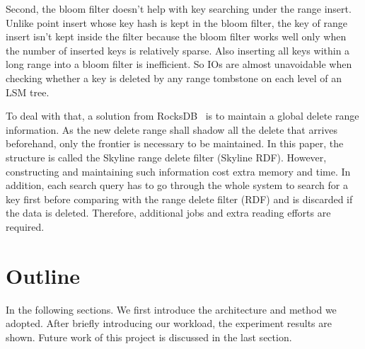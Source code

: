 \documentclass[sigconf]{acmart}
\begin{document}
    Second, the bloom filter doesn't help with key searching under the range insert. Unlike point insert whose key hash is kept in the bloom filter, the key of range insert isn't kept inside the filter because the bloom filter works well only when the number of inserted keys is relatively sparse. Also inserting all keys within a long range into a bloom filter is inefficient. So IOs are almost unavoidable when checking whether a key is deleted by any range tombstone on each level of an LSM tree. 

    To deal with that, a solution from RocksDB~\cite{RD_RocksDB} is to maintain a global delete range information. As the new delete range shall shadow all the delete that arrives beforehand, only the frontier is necessary to be maintained. In this paper, the structure is called the Skyline range delete filter (Skyline RDF). However, constructing and maintaining such information cost extra memory and time. In addition, each search query has to go through the whole system to search for a key first before comparing with the range delete filter (RDF) and is discarded if the data is deleted. Therefore, additional jobs and extra reading efforts are required.
\section{Outline}
\quad
    In the following sections. We first introduce the architecture and method we adopted. 
    After briefly introducing our workload, the experiment results are shown. Future work of this project is discussed in the last section.


\end{document}

